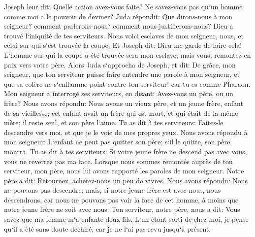 \verse Joseph leur dit: Quelle action avez-vous faite? Ne savez-vous pas qu`un homme comme moi a le pouvoir de deviner? 
\verse Juda répondit: Que dirons-nous à mon seigneur? comment parlerons-nous? comment nous justifierons-nous? Dieu a trouvé l`iniquité de tes serviteurs. Nous voici esclaves de mon seigneur, nous, et celui sur qui s`est trouvée la coupe. 
\verse Et Joseph dit: Dieu me garde de faire cela! L`homme sur qui la coupe a été trouvée sera mon esclave; mais vous, remontez en paix vers votre père. 
\verse Alors Juda s`approcha de Joseph, et dit: De grâce, mon seigneur, que ton serviteur puisse faire entendre une parole à mon seigneur, et que sa colère ne s`enflamme point contre ton serviteur! car tu es comme Pharaon. 
\verse Mon seigneur a interrogé ses serviteurs, en disant: Avez-vous un père, ou un frère? 
\verse Nous avons répondu: Nous avons un vieux père, et un jeune frère, enfant de sa vieillesse; cet enfant avait un frère qui est mort, et qui était de la même mère; il reste seul, et son père l`aime. 
\verse Tu as dit à tes serviteurs: Faites-le descendre vers moi, et que je le voie de mes propres yeux. 
\verse Nous avons répondu à mon seigneur: L`enfant ne peut pas quitter son père; s`il le quitte, son père mourra. 
\verse Tu as dit à tes serviteurs: Si votre jeune frère ne descend pas avec vous, vous ne reverrez pas ma face. 
\verse Lorsque nous sommes remontés auprès de ton serviteur, mon père, nous lui avons rapporté les paroles de mon seigneur. 
\verse Notre père a dit: Retournez, achetez-nous un peu de vivres. 
\verse Nous avons répondu: Nous ne pouvons pas descendre; mais, si notre jeune frère est avec nous, nous descendrons, car nous ne pouvons pas voir la face de cet homme, à moins que notre jeune frère ne soit avec nous. 
\verse Ton serviteur, notre père, nous a dit: Vous savez que ma femme m`a enfanté deux fils. 
\verse L`un étant sorti de chez moi, je pense qu`il a été sans doute déchiré, car je ne l`ai pas revu jusqu`à présent. 
